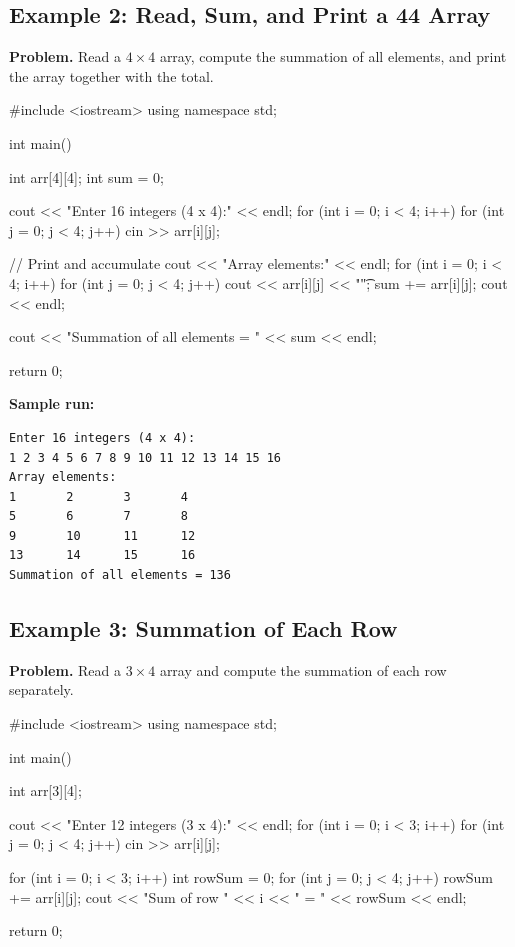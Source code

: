 \subsection{Example 2: Read, Sum, and Print a
            4\texorpdfstring{\texttimes}{x}4 Array}

\textbf{Problem.} Read a $4 \times 4$ array, compute the summation of
all elements, and print the array together with the total.

\begin{cppcode}
#include <iostream>
using namespace std;

int main() {
    int arr[4][4];
    int sum = 0;

    cout << "Enter 16 integers (4 x 4):" << endl;
    for (int i = 0; i < 4; i++) {
        for (int j = 0; j < 4; j++) {
            cin >> arr[i][j];
        }
    }

    // Print and accumulate
    cout << "Array elements:" << endl;
    for (int i = 0; i < 4; i++) {
        for (int j = 0; j < 4; j++) {
            cout << arr[i][j] << "\t";
            sum += arr[i][j];
        }
        cout << endl;
    }

    cout << "Summation of all elements = "
         << sum << endl;

    return 0;
}
\end{cppcode}

\textbf{Sample run:}
\begin{verbatim}
Enter 16 integers (4 x 4):
1 2 3 4 5 6 7 8 9 10 11 12 13 14 15 16
Array elements:
1       2       3       4
5       6       7       8
9       10      11      12
13      14      15      16
Summation of all elements = 136
\end{verbatim}

\subsection{Example 3: Summation of Each Row}

\textbf{Problem.} Read a $3 \times 4$ array and compute the summation
of each row separately.

\begin{cppcode}
#include <iostream>
using namespace std;

int main() {
    int arr[3][4];

    cout << "Enter 12 integers (3 x 4):" << endl;
    for (int i = 0; i < 3; i++) {
        for (int j = 0; j < 4; j++) {
            cin >> arr[i][j];
        }
    }

    for (int i = 0; i < 3; i++) {
        int rowSum = 0;
        for (int j = 0; j < 4; j++) {
            rowSum += arr[i][j];
        }
        cout << "Sum of row " << i
             << " = " << rowSum << endl;
    }

    return 0;
}
\end{cppcode}

